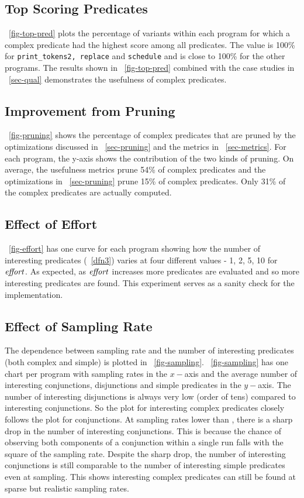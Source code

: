 \subsection{Top Scoring Predicates}
~\autoref{fig-top-pred} plots the percentage of variants within each program for which a complex predicate had the highest score among all predicates.  The value is 100\% for \texttt{print\_tokens2, replace} and \texttt{schedule} and is close to 100\% for the other programs.  The results shown in ~\autoref{fig-top-pred} combined with the case studies in ~\autoref{sec-qual} demonstrates the usefulness of complex predicates.

\subsection{Improvement from Pruning}
~\autoref{fig-pruning} shows the percentage of complex predicates that are pruned by the optimizations discussed in ~\autoref{sec-pruning} and the metrics in ~\autoref{sec-metrics}.  For each program, the y-axis shows the contribution of the two kinds of pruning.  On average, the usefulness metrics prune 54\% of complex predicates and the optimizations in ~\autoref{sec-pruning} prune 15\% of complex predicates.  Only 31\% of the complex predicates are actually computed.

\subsection{Effect of Effort}
~\autoref{fig-effort} has one curve for each program showing how the number of interesting predicates (~\autoref{dfn3}) varies at four different values - 1, 2, 5, 10 for $\mathit{effort}$.  As expected, as $\mathit{effort}$ increases more predicates are evaluated and so more interesting predicates are found.  This experiment serves as a sanity check for the implementation.

\subsection{Effect of Sampling Rate}
\label{sec-sampling}
The dependence between sampling rate and the number of interesting predicates (both complex and simple) is plotted in ~\autoref{fig-sampling}.  ~\autoref{fig-sampling} has one chart per program with sampling rates in the $x-$axis and the average number of interesting conjunctions, disjunctions and simple predicates in the $y-$axis.  The number of interesting disjunctions is always very low (order of tens) compared to interesting conjunctions.  So the plot for interesting complex predicates closely follows the plot for conjunctions.  At sampling rates lower than , there is a sharp drop in the number of interesting conjunctions.  This is because the chance of observing both components of a conjunction within a single run falls with the square of the sampling rate.  Despite the sharp drop, the number of interesting conjunctions is still comparable to the number of interesting simple predicates even at  sampling.  This shows interesting complex predicates can still be found at sparse but realistic sampling rates.

